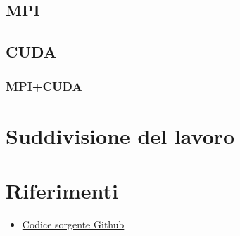\documentclass[conference]{IEEEtran}
\begin{document}
\subsection{MPI}
\subsection{CUDA}
\subsubsection{MPI+CUDA}
\section{Suddivisione del lavoro}
\section{Riferimenti}
\begin{itemize}
    \item \href{https://github.com/LucaFalasca/ParallelMatrixMultiplication}{Codice sorgente Github}
\end{itemize}
\vspace{12pt}
\end{document}
